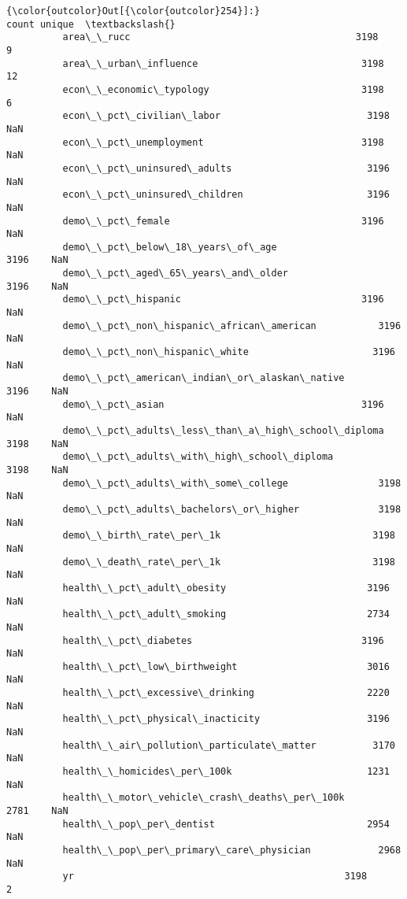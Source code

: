 \documentclass[11pt]{article}
\begin{document}
\begin{Verbatim}[commandchars=\\\{\}]
{\color{outcolor}Out[{\color{outcolor}254}]:}                                                  count unique  \textbackslash{}
          area\_\_rucc                                        3198      9   
          area\_\_urban\_influence                             3198     12   
          econ\_\_economic\_typology                           3198      6   
          econ\_\_pct\_civilian\_labor                          3198    NaN   
          econ\_\_pct\_unemployment                            3198    NaN   
          econ\_\_pct\_uninsured\_adults                        3196    NaN   
          econ\_\_pct\_uninsured\_children                      3196    NaN   
          demo\_\_pct\_female                                  3196    NaN   
          demo\_\_pct\_below\_18\_years\_of\_age                   3196    NaN   
          demo\_\_pct\_aged\_65\_years\_and\_older                 3196    NaN   
          demo\_\_pct\_hispanic                                3196    NaN   
          demo\_\_pct\_non\_hispanic\_african\_american           3196    NaN   
          demo\_\_pct\_non\_hispanic\_white                      3196    NaN   
          demo\_\_pct\_american\_indian\_or\_alaskan\_native       3196    NaN   
          demo\_\_pct\_asian                                   3196    NaN   
          demo\_\_pct\_adults\_less\_than\_a\_high\_school\_diploma  3198    NaN   
          demo\_\_pct\_adults\_with\_high\_school\_diploma         3198    NaN   
          demo\_\_pct\_adults\_with\_some\_college                3198    NaN   
          demo\_\_pct\_adults\_bachelors\_or\_higher              3198    NaN   
          demo\_\_birth\_rate\_per\_1k                           3198    NaN   
          demo\_\_death\_rate\_per\_1k                           3198    NaN   
          health\_\_pct\_adult\_obesity                         3196    NaN   
          health\_\_pct\_adult\_smoking                         2734    NaN   
          health\_\_pct\_diabetes                              3196    NaN   
          health\_\_pct\_low\_birthweight                       3016    NaN   
          health\_\_pct\_excessive\_drinking                    2220    NaN   
          health\_\_pct\_physical\_inacticity                   3196    NaN   
          health\_\_air\_pollution\_particulate\_matter          3170    NaN   
          health\_\_homicides\_per\_100k                        1231    NaN   
          health\_\_motor\_vehicle\_crash\_deaths\_per\_100k       2781    NaN   
          health\_\_pop\_per\_dentist                           2954    NaN   
          health\_\_pop\_per\_primary\_care\_physician            2968    NaN   
          yr                                                3198      2   
          

\end{Verbatim}
\end{document}
